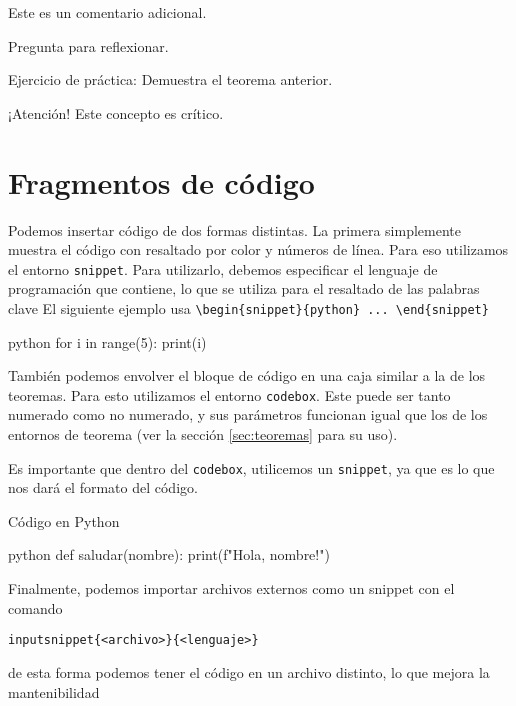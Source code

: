 \documentclass{simplenotes}
\begin{document}
\begin{remark}
Este es un comentario adicional.
\end{remark}

\begin{question}
Pregunta para reflexionar.
\end{question}

\begin{exercise}
Ejercicio de práctica: Demuestra el teorema anterior.
\end{exercise}

\begin{important}
¡Atención! Este concepto es crítico.
\end{important}




\section{Fragmentos de código}
Podemos insertar código de dos formas distintas. La primera simplemente muestra el código con resaltado por color y números de línea. Para eso utilizamos el entorno \texttt{snippet}.
Para utilizarlo, debemos especificar el lenguaje de programación que contiene, lo que se utiliza para el resaltado de las palabras clave
El siguiente ejemplo usa \verb|\begin{snippet}{python} ... \end{snippet}|

\begin{snippet}{python}
for i in range(5):
    print(i)
\end{snippet}

También podemos envolver el bloque de código en una caja similar a la de los teoremas. Para esto utilizamos el entorno \texttt{codebox}. Este puede ser tanto numerado como no numerado, y sus parámetros funcionan igual que los de los entornos de teorema (ver la sección \ref{sec:teoremas} para su uso).

Es importante que dentro del \texttt{codebox}, utilicemos un \texttt{snippet}, ya que es lo que nos dará el formato del código.

\begin{codebox*}{Código en Python}
  \begin{snippet}{python}
  def saludar(nombre):
      print(f"Hola, {nombre}!")
  \end{snippet}
\end{codebox*}
\noindent
Finalmente, podemos importar archivos externos como un snippet con el comando
\begin{verbatim}
inputsnippet{<archivo>}{<lenguaje>}
\end{verbatim}
de esta forma podemos tener el código en un archivo distinto, lo que mejora la mantenibilidad
\end{document}
